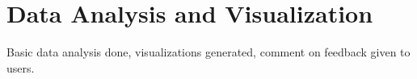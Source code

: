 \chapter{Data Analysis and Visualization}
Basic data analysis done, visualizations generated, comment on feedback given to users.